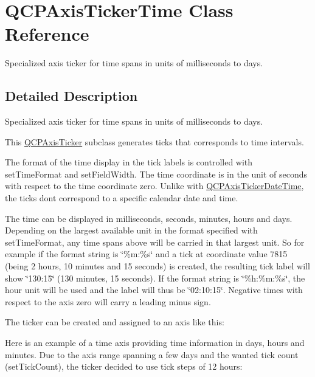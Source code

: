 \hypertarget{class_q_c_p_axis_ticker_time}{}\section{Q\+C\+P\+Axis\+Ticker\+Time Class Reference}
\label{class_q_c_p_axis_ticker_time}


Specialized axis ticker for time spans in units of milliseconds to days.  




\subsection{Detailed Description}
Specialized axis ticker for time spans in units of milliseconds to days. 



This \mbox{\hyperlink{class_q_c_p_axis_ticker}{Q\+C\+P\+Axis\+Ticker}} subclass generates ticks that corresponds to time intervals.

The format of the time display in the tick labels is controlled with set\+Time\+Format and set\+Field\+Width. The time coordinate is in the unit of seconds with respect to the time coordinate zero. Unlike with \mbox{\hyperlink{class_q_c_p_axis_ticker_date_time}{Q\+C\+P\+Axis\+Ticker\+Date\+Time}}, the ticks don\textquotesingle{}t correspond to a specific calendar date and time.

The time can be displayed in milliseconds, seconds, minutes, hours and days. Depending on the largest available unit in the format specified with set\+Time\+Format, any time spans above will be carried in that largest unit. So for example if the format string is \char`\"{}\%m\+:\%s\char`\"{} and a tick at coordinate value 7815 (being 2 hours, 10 minutes and 15 seconds) is created, the resulting tick label will show \char`\"{}130\+:15\char`\"{} (130 minutes, 15 seconds). If the format string is \char`\"{}\%h\+:\%m\+:\%s\char`\"{}, the hour unit will be used and the label will thus be \char`\"{}02\+:10\+:15\char`\"{}. Negative times with respect to the axis zero will carry a leading minus sign.

The ticker can be created and assigned to an axis like this\+: 
\begin{DoxyCodeInclude}
\end{DoxyCodeInclude}
 Here is an example of a time axis providing time information in days, hours and minutes. Due to the axis range spanning a few days and the wanted tick count (set\+Tick\+Count), the ticker decided to use tick steps of 12 hours\+:



